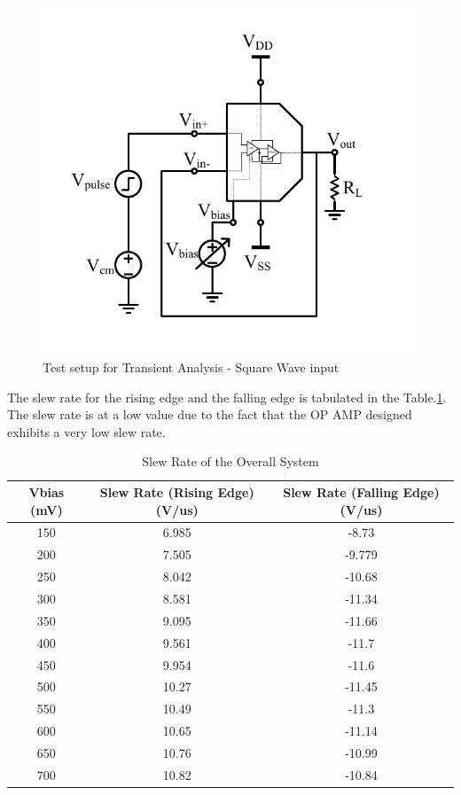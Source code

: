 \begin{figure} [H]
\centering
\includegraphics[scale=1]{Figures/Test_Benches/Overall/SLEW.pdf}
\caption{Test setup for Transient Analysis - Square Wave input}
\label{fig:TB_SLEW}
\end{figure}
The slew rate for the rising edge and the falling edge is tabulated in the Table.\ref{tab:SLEW}. The slew rate is at a low value due to the fact that the OP AMP designed exhibits a very low slew rate.
 
\begin{table} [H]
\centering
\begin{tabular}{@{}ccc@{}}
\toprule
Vbias (mV)			& Slew Rate (Rising Edge)(V/us)			& Slew Rate (Falling Edge)(V/us)	 \\ \midrule
150					& 6.985	 					& -8.73					 \\
200					& 7.505 					& -9.779				 \\
250					& 8.042 					& -10.68				 \\
300					& 8.581 					& -11.34				 \\
350					& 9.095						& -11.66				 \\
400					& 9.561						& -11.7					 \\
450					& 9.954 					& -11.6					 \\
500					& 10.27						& -11.45				 \\
550					& 10.49	 					& -11.3					 \\
600					& 10.65 					& -11.14				 \\
650					& 10.76 					& -10.99				 \\
700 				& 10.82 					& -10.84				 \\
\bottomrule
\end{tabular}
\caption{Slew Rate of the Overall System}
\label{tab:SLEW}
\end{table}

